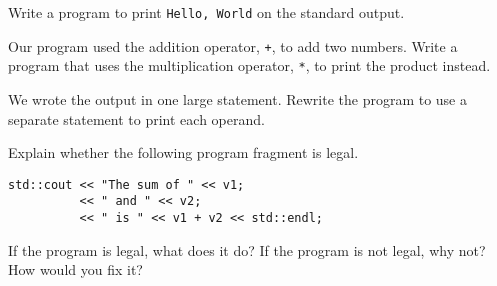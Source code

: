 %
%
\begin{question}
Write a program to print \verb|Hello, World| on the standard
output.
\end{question}

\begin{question}
Our program used the addition operator, \verb|+|, to add two
numbers. Write a program that uses the multiplication operator, \verb|*|, to print
the product instead.
\end{question}

\begin{question}
We wrote the output in one large statement. Rewrite the
program to use a separate statement to print each operand.
\end{question}

\begin{question}
Explain whether the following program fragment is legal.
\begin{lstlisting}
std::cout << "The sum of " << v1;
          << " and " << v2;
          << " is " << v1 + v2 << std::endl;
\end{lstlisting}
If the program is legal, what does it do? If the program is not legal, why
not? How would you fix it?
\end{question}
